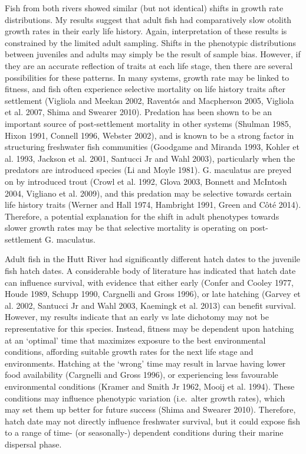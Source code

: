 \documentclass[]{book}
\begin{document}
Fish from both rivers showed similar (but not identical) shifts in
growth rate distributions. My results suggest that adult fish had
comparatively slow otolith growth rates in their early life history.
Again, interpretation of these results is constrained by the limited
adult sampling. Shifts in the phenotypic distributions between juveniles
and adults may simply be the result of sample bias. However, if they are
an accurate reflection of traits at each life stage, then there are
several possibilities for these patterns. In many systems, growth rate
may be linked to fitness, and fish often experience selective mortality
on life history traits after settlement (Vigliola and Meekan 2002,
Raventós and Macpherson 2005, Vigliola et al. 2007, Shima and Swearer
2010). Predation has been shown to be an important source of
post-settlement mortality in other systems (Shulman 1985, Hixon 1991,
Connell 1996, Webster 2002), and is known to be a strong factor in
structuring freshwater fish communities (Goodgame and Miranda 1993,
Kohler et al. 1993, Jackson et al. 2001, Santucci Jr and Wahl 2003),
particularly when the predators are introduced species (Li and Moyle
1981). G. maculatus are preyed on by introduced trout (Crowl et al.
1992, Glova 2003, Bonnett and McIntosh 2004, Vigliano et al. 2009), and
this predation may be selective towards certain life history traits
(Werner and Hall 1974, Hambright 1991, Green and Côté 2014). Therefore,
a potential explanation for the shift in adult phenotypes towards slower
growth rates may be that selective mortality is operating on
post-settlement G. maculatus.

Adult fish in the Hutt River had significantly different hatch dates to
the juvenile fish hatch dates. A considerable body of literature has
indicated that hatch date can influence survival, with evidence that
either early (Confer and Cooley 1977, Houde 1989, Schupp 1990, Cargnelli
and Gross 1996), or late hatching (Garvey et al. 2002, Santucci Jr and
Wahl 2003, Kaemingk et al. 2013) can benefit survival. However, my
results indicate that an early vs late dichotomy may not be
representative for this species. Instead, fitness may be dependent upon
hatching at an `optimal' time that maximizes exposure to the best
environmental conditions, affording suitable growth rates for the next
life stage and environments. Hatching at the `wrong' time may result in
larvae having lower food availability (Cargnelli and Gross 1996), or
experiencing less favourable environmental conditions (Kramer and Smith
Jr 1962, Mooij et al. 1994). These conditions may influence phenotypic
variation (i.e.~alter growth rates), which may set them up better for
future success (Shima and Swearer 2010). Therefore, hatch date may not
directly influence freshwater survival, but it could expose fish to a
range of time- (or seasonally-) dependent conditions during their marine
dispersal phase.
\end{document}
